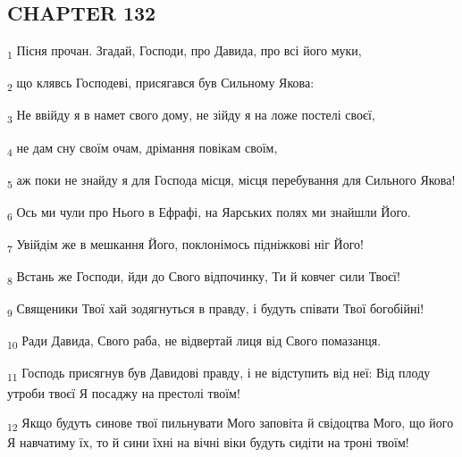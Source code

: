 \subsection{CHAPTER 132}
\begin{tcolorbox}
\textsubscript{1} Пісня прочан. Згадай, Господи, про Давида, про всі його муки,
\end{tcolorbox}
\begin{tcolorbox}
\textsubscript{2} що клявсь Господеві, присягався був Сильному Якова:
\end{tcolorbox}
\begin{tcolorbox}
\textsubscript{3} Не ввійду я в намет свого дому, не зійду я на ложе постелі своєї,
\end{tcolorbox}
\begin{tcolorbox}
\textsubscript{4} не дам сну своїм очам, дрімання повікам своїм,
\end{tcolorbox}
\begin{tcolorbox}
\textsubscript{5} аж поки не знайду я для Господа місця, місця перебування для Сильного Якова!
\end{tcolorbox}
\begin{tcolorbox}
\textsubscript{6} Ось ми чули про Нього в Ефрафі, на Яарських полях ми знайшли Його.
\end{tcolorbox}
\begin{tcolorbox}
\textsubscript{7} Увійдім же в мешкання Його, поклонімось підніжкові ніг Його!
\end{tcolorbox}
\begin{tcolorbox}
\textsubscript{8} Встань же Господи, йди до Свого відпочинку, Ти й ковчег сили Твоєї!
\end{tcolorbox}
\begin{tcolorbox}
\textsubscript{9} Священики Твої хай зодягнуться в правду, і будуть співати Твої богобійні!
\end{tcolorbox}
\begin{tcolorbox}
\textsubscript{10} Ради Давида, Свого раба, не відвертай лиця від Свого помазанця.
\end{tcolorbox}
\begin{tcolorbox}
\textsubscript{11} Господь присягнув був Давидові правду, і не відступить від неї: Від плоду утроби твоєї Я посаджу на престолі твоїм!
\end{tcolorbox}
\begin{tcolorbox}
\textsubscript{12} Якщо будуть синове твої пильнувати Мого заповіта й свідоцтва Мого, що його Я навчатиму їх, то й сини їхні на вічні віки будуть сидіти на троні твоїм!
\end{tcolorbox}
